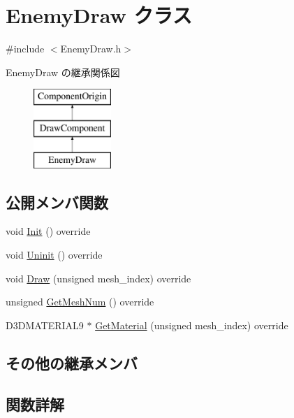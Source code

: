 \hypertarget{class_enemy_draw}{}\section{Enemy\+Draw クラス}
\label{class_enemy_draw}


{\ttfamily \#include $<$Enemy\+Draw.\+h$>$}

Enemy\+Draw の継承関係図\begin{figure}[H]
\begin{center}
\leavevmode
\includegraphics[height=3.000000cm]{class_enemy_draw}
\end{center}
\end{figure}
\subsection*{公開メンバ関数}
\begin{DoxyCompactItemize}
\item 
void \mbox{\hyperlink{class_enemy_draw_aa1659c35fa757db6a6cf07e26ad9ddfb}{Init}} () override
\item 
void \mbox{\hyperlink{class_enemy_draw_a2861dc0623b0be7726bc69a6a469190e}{Uninit}} () override
\item 
void \mbox{\hyperlink{class_enemy_draw_a4d922df05a3a3f4117399817c24554e6}{Draw}} (unsigned mesh\+\_\+index) override
\item 
unsigned \mbox{\hyperlink{class_enemy_draw_af61c817f8c00dae7aa990544721a2e15}{Get\+Mesh\+Num}} () override
\item 
D3\+D\+M\+A\+T\+E\+R\+I\+A\+L9 $\ast$ \mbox{\hyperlink{class_enemy_draw_a081c6a1c8c007b604885e6fbd0ee3641}{Get\+Material}} (unsigned mesh\+\_\+index) override
\end{DoxyCompactItemize}
\subsection*{その他の継承メンバ}


\subsection{関数詳解}
\mbox{\label{class_enemy_draw_a4d922df05a3a3f4117399817c24554e6}} 
